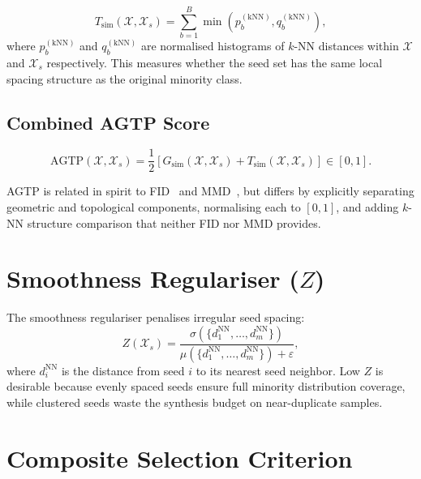 \begin{equation}
  T_{\mathrm{sim}}(\mathcal{X}, \mathcal{X}_s) = \sum_{b=1}^B \min(p_b^{(\mathrm{kNN})}, q_b^{(\mathrm{kNN})}),
  \label{eq:topo_sim}
\end{equation}
where $p_b^{(\mathrm{kNN})}$ and $q_b^{(\mathrm{kNN})}$ are normalised histograms of $k$-NN distances within $\mathcal{X}$ and $\mathcal{X}_s$ respectively.
This measures whether the seed set has the same local spacing structure as the original minority class.

\subsection{Combined AGTP Score}

\begin{equation}
  \mathrm{AGTP}(\mathcal{X}, \mathcal{X}_s) = \frac{1}{2}\left[G_{\mathrm{sim}}(\mathcal{X}, \mathcal{X}_s) + T_{\mathrm{sim}}(\mathcal{X}, \mathcal{X}_s)\right] \in [0,1].
  \label{eq:agtp}
\end{equation}

AGTP is related in spirit to FID~\cite{heusel2017gans} and MMD~\cite{gretton2012kernel}, but differs by explicitly separating geometric and topological components, normalising each to $[0,1]$, and adding $k$-NN structure comparison that neither FID nor MMD provides.

\section{Smoothness Regulariser ($Z$)}
\label{sec:seed:z}

The smoothness regulariser penalises irregular seed spacing:
\begin{equation}
  Z(\mathcal{X}_s) = \frac{\sigma(\{d_1^{\mathrm{NN}}, \ldots, d_m^{\mathrm{NN}}\})}{\mu(\{d_1^{\mathrm{NN}}, \ldots, d_m^{\mathrm{NN}}\}) + \varepsilon},
  \label{eq:z_score}
\end{equation}
where $d_i^{\mathrm{NN}}$ is the distance from seed $i$ to its nearest seed neighbor.
Low $Z$ is desirable because evenly spaced seeds ensure full minority distribution coverage, while clustered seeds waste the synthesis budget on near-duplicate samples.

\section{Composite Selection Criterion}
\label{sec:seed:criterion}

